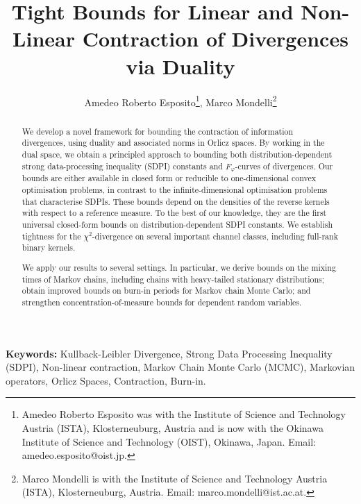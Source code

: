 \documentclass[11pt]{article}
\theoremstyle{plain}
\theoremstyle{remark}
\begin{document}
\title{Tight Bounds for Linear and Non-Linear Contraction of Divergences via Duality}

\author{Amedeo Roberto Esposito\thanks{Amedeo Roberto Esposito was with the Institute of Science and Technology Austria (ISTA), Klosterneuburg, Austria and is now with the Okinawa Institute of Science and Technology (OIST), Okinawa, Japan. Email: amedeo.esposito@oist.jp.}, Marco Mondelli\thanks{Marco Mondelli is with the Institute of Science and Technology Austria (ISTA), Klosterneuburg, Austria. Email: marco.mondelli@ist.ac.at.}
}        %

    

\maketitle

\begin{abstract}
We develop a novel framework for bounding the contraction of information divergences, using duality and associated norms in Orlicz spaces. By working in the dual space, we obtain a principled approach to bounding both distribution-dependent strong data-processing inequality (SDPI) constants and \(F_\varphi\)-curves of divergences. Our bounds are either available in closed form or reducible to one-dimensional convex optimisation problems, in contrast to the infinite-dimensional optimisation problems that characterise SDPIs. These bounds depend on the densities of the reverse kernels with respect to a reference measure. To the best of our knowledge, they are the first universal closed-form bounds on distribution-dependent SDPI constants. We establish tightness for the \(\chi^2\)-divergence on several important channel classes, including full-rank binary kernels.

We apply our results to several settings. In particular, we derive bounds on the mixing times of Markov chains, including chains with heavy-tailed stationary distributions; obtain improved bounds on burn-in periods for Markov chain Monte Carlo; and strengthen concentration-of-measure bounds for dependent random variables.
\end{abstract}

\smallskip

\smallskip

\noindent\textbf{Keywords:} Kullback-Leibler Divergence, Strong Data Processing Inequality (SDPI), Non-linear contraction, Markov Chain Monte Carlo (MCMC), Markovian operators, Orlicz Spaces, Contraction, Burn-in.
\end{document}
